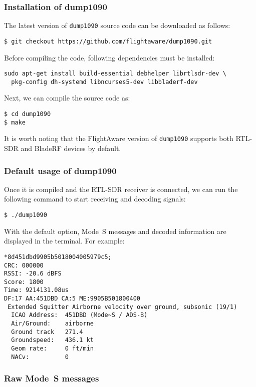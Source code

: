 \subsubsection{Installation of dump1090}
The latest version of \texttt{dump1090} source code can be downloaded as follows:

\begin{verbatim}
$ git checkout https://github.com/flightaware/dump1090.git
\end{verbatim}

Before compiling the code, following dependencies must be installed:

\begin{verbatim}
sudo apt-get install build-essential debhelper librtlsdr-dev \
  pkg-config dh-systemd libncurses5-dev libbladerf-dev
\end{verbatim}

Next, we can compile the source code as:

\begin{verbatim}
$ cd dump1090
$ make
\end{verbatim}

It is worth noting that the FlightAware version of \texttt{dump1090} supports both RTL-SDR and BladeRF devices by default.

\subsubsection{Default usage of dump1090}

Once it is compiled and the RTL-SDR receiver is connected, we can run the following command to start receiving and decoding signals:

\begin{verbatim}
$ ./dump1090
\end{verbatim}

With the default option, Mode~S messages and decoded information are displayed in the terminal. For example:

\begin{verbatim}
*8d451dbd9905b5018004005979c5;
CRC: 000000
RSSI: -20.6 dBFS
Score: 1800
Time: 9214131.08us
DF:17 AA:451DBD CA:5 ME:9905B501800400
 Extended Squitter Airborne velocity over ground, subsonic (19/1)
  ICAO Address:  451DBD (Mode~S / ADS-B)
  Air/Ground:    airborne
  Ground track   271.4
  Groundspeed:   436.1 kt
  Geom rate:     0 ft/min
  NACv:          0
\end{verbatim}

\subsubsection{Raw Mode~S messages}

